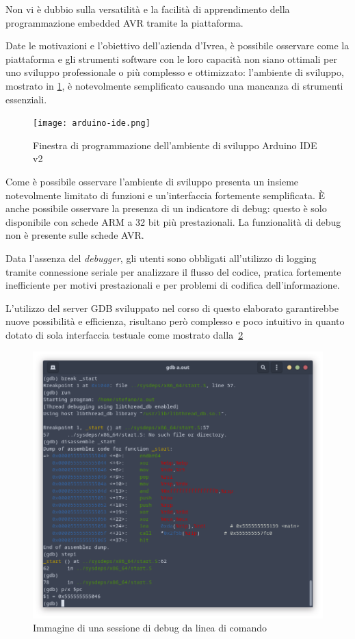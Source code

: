 Non vi è dubbio sulla versatilità e la facilità di apprendimento della programmazione embedded AVR tramite la piattaforma.

Date le motivazioni e l'obiettivo dell'azienda d'Ivrea, è possibile osservare come la piattaforma e gli strumenti software con le loro  capacità non siano ottimali per uno sviluppo professionale o più complesso e ottimizzato: l'ambiente di sviluppo, mostrato in \cref{fig:arduino-ide}, è notevolmente semplificato causando una mancanza di strumenti essenziali.

\begin{figure}
    \centering
    \texttt{[image: arduino-ide.png]}
    \caption[Immagine di arduino IDE v2]{Finestra di programmazione dell'ambiente di sviluppo Arduino IDE v2}\label{fig:arduino-ide}
\end{figure}

Come è possibile osservare l'ambiente di sviluppo presenta un insieme notevolmente limitato di funzioni e un'interfaccia fortemente semplificata. È anche possibile osservare la presenza di un indicatore di debug: questo è solo disponibile con schede ARM a 32 bit più prestazionali. La funzionalità di debug non è presente sulle schede AVR.\@

Data l'assenza del \textit{debugger}, gli utenti sono obbligati all'utilizzo di logging tramite connessione seriale per analizzare il flusso del codice, pratica fortemente inefficiente per motivi prestazionali e per problemi di codifica dell'informazione.

L'utilizzo del server GDB sviluppato nel corso di questo elaborato garantirebbe nuove possibilità e efficienza, risultano però complesso e poco intuitivo in quanto dotato di sola interfaccia testuale come mostrato dalla~\cref{fig:gdb-cli}

\begin{figure}
    \centering
    \includegraphics[width=.7\textwidth]{gdb-cli.png}
    \caption[]{Immagine di una sessione di debug da linea di comando}\label{fig:gdb-cli}
\end{figure}

